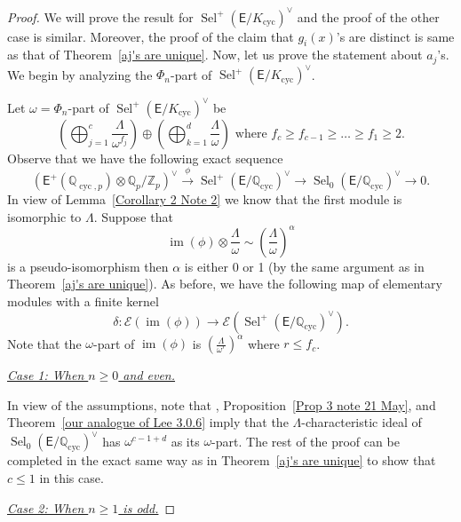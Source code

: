 \documentclass{amsart}
\numberwithin{equation}{section}
\theoremstyle{remark}
\newcommand{\EC}{\mathsf{E}}
\newcommand{\Qp}{\mathbb{Q}_p}
\newcommand{\Zp}{\mathbb{Z}_p}
\newcommand{\Q}{\mathbb{Q}}
\newcommand{\cyc}{\operatorname{{cyc}}}
\newcommand{\image}{\operatorname{im}}
\newcommand{\Sel}{\operatorname{Sel}}
\theoremstyle{plain} %
\begin{document}
\begin{proof}
We will prove the result for $\Sel^+(\EC/K_{\cyc})^\vee$ and the proof of the other case is similar.
Moreover, the proof of the claim that $g_i(x)$'s are distinct is same as that of Theorem~\ref{aj's are unique}.
Now, let us prove the statement about $a_j$'s.
We begin by analyzing the $\Phi_{n}$-part of $\Sel^+(\EC/K_{\cyc})^\vee$.

Let $\omega = \Phi_n$-part of $\Sel^+(\EC/K_{\cyc})^\vee$ be
\[
\left( \bigoplus_{j=1}^c \frac{\Lambda}{\omega^{f_j}}\right) \oplus \left( \bigoplus_{k=1}^d \frac{\Lambda}{\omega}\right) \text{ where } f_c \geq f_{c-1} \geq \ldots \geq f_1 \geq 2.
\]
Observe that we have the following exact sequence
\begin{equation}
\label{intro theta}
(\EC^+(\Q_{\cyc,p}) \otimes \Qp/\Zp)^\vee \xrightarrow{\phi} \Sel^+(\EC/\Q_{\cyc})^\vee \longrightarrow \Sel_0(\EC/\Q_{\cyc})^\vee \longrightarrow 0.
\end{equation}
In view of Lemma~\ref{Corollary 2 Note 2} we know that the first module is isomorphic to $\Lambda$.
Suppose that
\[
\image(\phi) \otimes \frac{\Lambda}{\omega} \sim \left( \frac{\Lambda}{\omega}\right)^\alpha
\]
is a pseudo-isomorphism then $\alpha$ is either 0 or 1 (by the same argument as in Theorem~\ref{aj's are unique}).
As before, we have the following map of elementary modules with a finite kernel 
\[
\delta: \mathscr{E}(\image(\phi)) \longrightarrow \mathscr{E}(\Sel^{+}(\EC/\Q_{\cyc})^\vee).
\]
Note that the $\omega$-part of $\image(\phi)$ is $\left(\frac{\Lambda}{\omega^r}\right)^\alpha$ where $r \leq f_c$.

\smallskip

\underline{\emph{Case 1: When $n\geq 0$ and even.}}

In view of the assumptions, note that \cite[Theorem~C]{Lei23}, Proposition~\ref{Prop 3 note 21 May}, and Theorem~\ref{our analogue of Lee 3.0.6} imply that the $\Lambda$-characteristic ideal of $\Sel_0(\EC/\Q_{\cyc})^\vee$ has $\omega^{c-1+d}$ as its $\omega$-part.
The rest of the proof can be completed in the exact same way as in Theorem~\ref{aj's are unique} to show that $c \leq 1$ in this case.

\smallskip

\underline{\emph{Case 2: When $n\geq 1$ is odd.}}


\end{proof}
\end{document}
